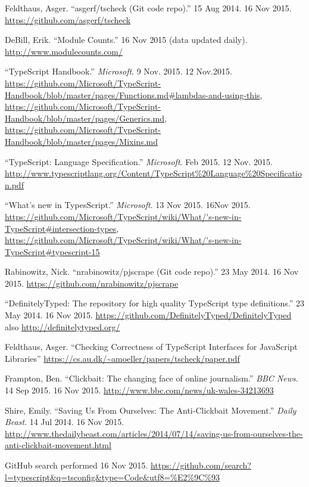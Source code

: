 \documentclass[]{article}
\begin{document}
\begin{thebibliography}{15}
Feldthaus, Asger. ``asgerf/tscheck (Git code repo).'' 15 Aug
2014. 16 Nov 2015. \url{https://github.com/asgerf/tscheck}

DeBill, Erik. ``Module Counts.'' 16 Nov 2015 (data updated
daily). \url{http://www.modulecounts.com/}

``TypeScript Handbook.'' \emph{Microsoft}. 9 Nov. 2015. 12 Nov.2015.
\url{https://github.com/Microsoft/TypeScript-Handbook/blob/master/pages/Functions.md\#lambdas-and-using-this}, \url{https://github.com/Microsoft/TypeScript-Handbook/blob/master/pages/Generics.md}, \url{https://github.com/Microsoft/TypeScript-Handbook/blob/master/pages/Mixins.md}

``TypeScript: Language Specification.'' \emph{Microsoft}. Feb
2015. 12 Nov. 2015.
\url{http://www.typescriptlang.org/Content/TypeScript\%20Language\%20Specification.pdf}

``What's new in TypesScript.'' \emph{Microsoft}. 13 Nov 2015. 16Nov 2015.
\url{https://github.com/Microsoft/TypeScript/wiki/What/'s-new-in-TypeScript\#intersection-types}, \url{https://github.com/Microsoft/TypeScript/wiki/What/'s-new-in-TypeScript\#typescript-15}

Rabinowitz, Nick. ``nrabinowitz/pjscrape (Git code repo).'' 23
May 2014. 16 Nov 2015. \url{https://github.com/nrabinowitz/pjscrape}

``DefinitelyTyped: The repository for high quality TypeScript
type definitions.'' 23 May 2014. 16 Nov 2015.
\url{https://github.com/DefinitelyTyped/DefinitelyTyped} also
\url{http://definitelytyped.org/}

Feldthaus, Asger. ``Checking Correctness of TypeScript
Interfaces for JavaScript Libraries''
\url{https://cs.au.dk/~amoeller/papers/tscheck/paper.pdf}

Frampton, Ben. ``Clickbait: The changing face of online
journalism.'' \emph{BBC News}. 14 Sep 2015. 16 Nov 2015.
\url{http://www.bbc.com/news/uk-wales-34213693}

 Shire, Emily. ``Saving Us From Ourselves: The Anti-Clickbait
Movement.'' \emph{Daily Beast}. 14 Jul 2014. 16 Nov 2015.
\url{http://www.thedailybeast.com/articles/2014/07/14/saving-us-from-ourselves-the-anti-clickbait-movement.html}

GitHub search performed 16 Nov 2015.
\url{https://github.com/search?l=typescript\&q=tsconfig\&type=Code\&utf8=\%E2\%9C\%93}
\end{thebibliography}
\end{document}
